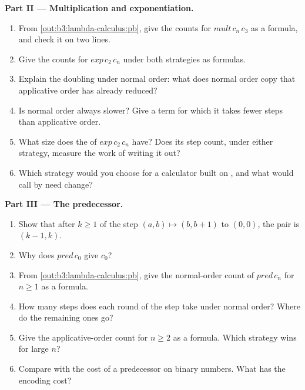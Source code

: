 \begin{problem}
\medskip\noindent\textbf{Part II --- Multiplication and exponentiation.}
\begin{enumerate}[resume]
\item From \cref{out:b3:lambda-calculus:pb}, give the counts for $\mathit{mult}\,c_n\,c_3$ as a formula, and check it on two lines.
\item Give the counts for $\mathit{exp}\,c_2\,c_n$ under both strategies as formulas.
\item Explain the doubling under normal order: what does normal order copy that applicative order has already reduced?
\item Is normal order always slower? Give a term for which it takes fewer steps than applicative order.
\item What size does the  of $\mathit{exp}\,c_2\,c_n$ have? Does its step count, under either strategy, measure the work of writing it out?
\item Which strategy would you choose for a calculator built on , and what would call by need change?
\end{enumerate}

\medskip\noindent\textbf{Part III --- The predecessor.}
\begin{enumerate}[resume]
\item Show that after $k \ge 1$  of the step $(a, b) \mapsto (b, b + 1)$ to $(0, 0)$, the pair is $(k - 1, k)$.
\item Why does $\mathit{pred}\,c_0$ give $c_0$?
\item From \cref{out:b3:lambda-calculus:pb}, give the normal-order count of $\mathit{pred}\,c_n$ for $n \ge 1$ as a formula.
\item How many steps does each round of the step take under normal order? Where do the remaining ones go?
\item Give the applicative-order count for $n \ge 2$ as a formula. Which strategy wins for large $n$?
\item Compare with the cost of a predecessor on binary numbers. What has the encoding cost?
\end{enumerate}


\end{problem}
